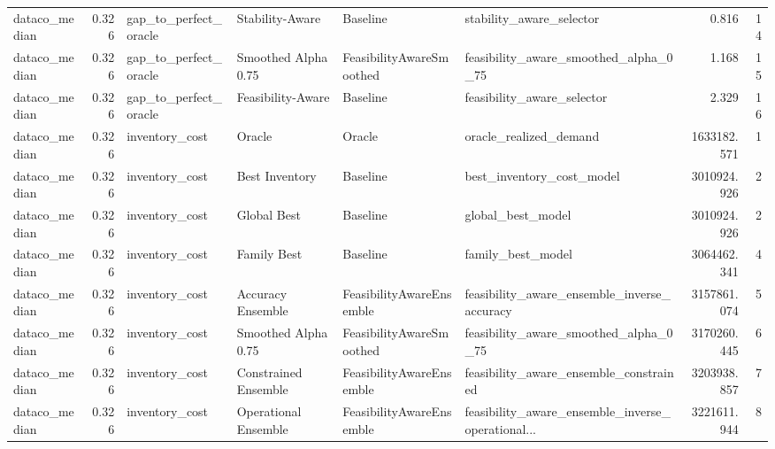 \begin{table}
{\begin{tabular}{lrllllrr}
 dataco\_median &             0.326 &       gap\_to\_perfect\_oracle &       Stability-Aware &                  Baseline &                           stability\_aware\_selector &         0.816 &              14 \\
 dataco\_median &             0.326 &       gap\_to\_perfect\_oracle &   Smoothed Alpha 0.75 &  FeasibilityAwareSmoothed &              feasibility\_aware\_smoothed\_alpha\_0\_75 &         1.168 &              15 \\
 dataco\_median &             0.326 &       gap\_to\_perfect\_oracle &     Feasibility-Aware &                  Baseline &                         feasibility\_aware\_selector &         2.329 &              16 \\
 dataco\_median &             0.326 &              inventory\_cost &                Oracle &                    Oracle &                             oracle\_realized\_demand &   1633182.571 &               1 \\
 dataco\_median &             0.326 &              inventory\_cost &        Best Inventory &                  Baseline &                          best\_inventory\_cost\_model &   3010924.926 &               2 \\
 dataco\_median &             0.326 &              inventory\_cost &           Global Best &                  Baseline &                                  global\_best\_model &   3010924.926 &               2 \\
 dataco\_median &             0.326 &              inventory\_cost &           Family Best &                  Baseline &                                  family\_best\_model &   3064462.341 &               4 \\
 dataco\_median &             0.326 &              inventory\_cost &     Accuracy Ensemble &  FeasibilityAwareEnsemble &        feasibility\_aware\_ensemble\_inverse\_accuracy &   3157861.074 &               5 \\
 dataco\_median &             0.326 &              inventory\_cost &   Smoothed Alpha 0.75 &  FeasibilityAwareSmoothed &              feasibility\_aware\_smoothed\_alpha\_0\_75 &   3170260.445 &               6 \\
 dataco\_median &             0.326 &              inventory\_cost &  Constrained Ensemble &  FeasibilityAwareEnsemble &             feasibility\_aware\_ensemble\_constrained &   3203938.857 &               7 \\
 dataco\_median &             0.326 &              inventory\_cost &  Operational Ensemble &  FeasibilityAwareEnsemble &  feasibility\_aware\_ensemble\_inverse\_operational... &   3221611.944 &               8 \\

\end{tabular}}
\end{table}
